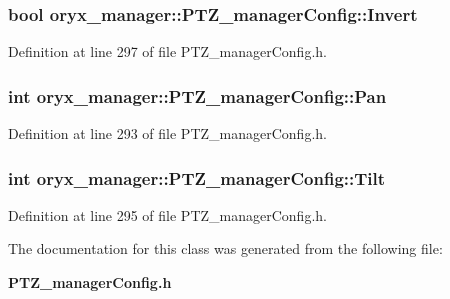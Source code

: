 \subsubsection[{\-Invert}]{\setlength{\rightskip}{0pt plus 5cm}bool {\bf oryx\-\_\-manager\-::\-P\-T\-Z\-\_\-manager\-Config\-::\-Invert}}\label{classoryx__manager_1_1PTZ__managerConfig_a5909067cc39f544ecd915a5753f06e5b}


\-Definition at line 297 of file \-P\-T\-Z\-\_\-manager\-Config.\-h.

\subsubsection[{\-Pan}]{\setlength{\rightskip}{0pt plus 5cm}int {\bf oryx\-\_\-manager\-::\-P\-T\-Z\-\_\-manager\-Config\-::\-Pan}}\label{classoryx__manager_1_1PTZ__managerConfig_a1233b7900a4c5d7a7f613c1e8807251f}


\-Definition at line 293 of file \-P\-T\-Z\-\_\-manager\-Config.\-h.

\subsubsection[{\-Tilt}]{\setlength{\rightskip}{0pt plus 5cm}int {\bf oryx\-\_\-manager\-::\-P\-T\-Z\-\_\-manager\-Config\-::\-Tilt}}\label{classoryx__manager_1_1PTZ__managerConfig_a82e6caaac20c3ceb807a5cbc4010c242}


\-Definition at line 295 of file \-P\-T\-Z\-\_\-manager\-Config.\-h.



\-The documentation for this class was generated from the following file\-:\begin{DoxyCompactItemize}
\item 
{\bf \-P\-T\-Z\-\_\-manager\-Config.\-h}\end{DoxyCompactItemize}
